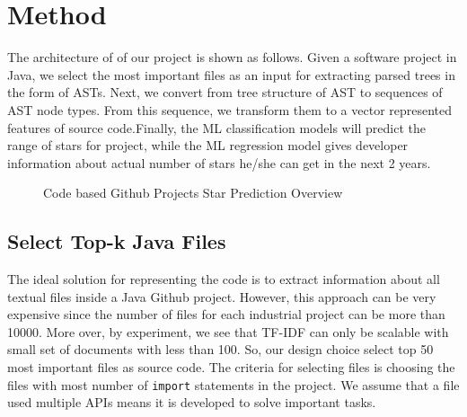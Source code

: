 \section{Method}
The architecture of of our project is shown as follows. Given a software project in Java, we select the most important files as an input for extracting parsed trees in the form of ASTs. Next, we convert from tree structure of AST to sequences of AST node types. From this sequence, we transform them to a vector represented features of source code.Finally, the ML classification models will predict the range of stars for project, while the ML regression model gives developer information about actual number of stars he/she can get in the next 2 years.

\begin{figure}
        \caption{Code based Github Projects Star Prediction Overview}
        \label{fig:mapping_expression} 
\end{figure}
\subsection{Select Top-k Java Files}
The ideal solution for representing the code is to extract information about all textual files inside a Java Github project. However, this approach can be very expensive since the number of files for each industrial project can be more than 10000. More over, by experiment, we see that TF-IDF can only be scalable with small set of documents with less than 100. So, our design choice select top 50 most important files as source code. The criteria for selecting files is choosing the files with most number of \texttt{import} statements in the project. We assume that a file used multiple APIs means it is developed to solve important tasks.
